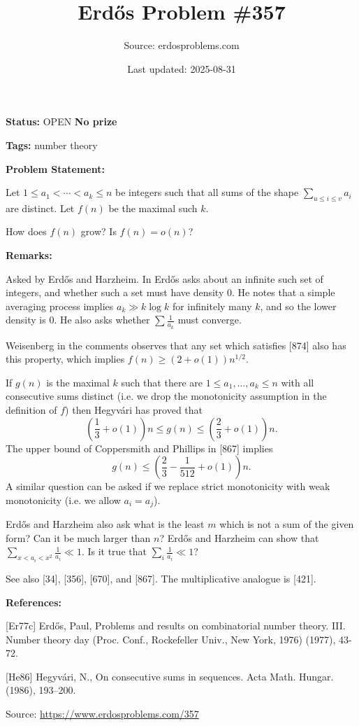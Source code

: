 \documentclass{article}
\title{Erd\H{o}s Problem \#357}
\date{Last updated: 2025-08-31}
\author{Source: erdosproblems.com}
\begin{document}
\maketitle

\noindent\textbf{Status:} OPEN \quad \textbf{No prize}

\noindent\textbf{Tags:} number theory

\medskip
\noindent\textbf{Problem Statement:}

Let $1\leq a_1<\cdots <a_k\leq n$ be integers such that all sums of the shape $\sum_{u\leq i\leq v}a_i$ are distinct. Let $f(n)$ be the maximal such $k$.

How does $f(n)$ grow? Is $f(n)=o(n)$?

\bigskip
\noindent\textbf{Remarks:}

Asked by Erd\H{o}s and Harzheim. In \cite{Er77c} Erd\H{o}s asks about an infinite such set of integers, and whether such a set must have density $0$. He notes that a simple averaging process implies $a_k \gg k\log k$ for infinitely many $k$, and so the lower density is $0$. He also asks whether $\sum\frac{1}{a_k}$ must converge.

Weisenberg in the comments observes that any set which satisfies [874] also has this property, which implies $f(n)\geq (2+o(1))n^{1/2}$.

If $g(n)$ is the maximal $k$ such that there are $1\leq a_1,\ldots,a_k\leq n$ with all consecutive sums distinct (i.e. we drop the monotonicity assumption in the definition of $f$) then Hegyv\'{a}ri \cite{He86} has proved that\[\left(\frac{1}{3}+o(1)\right) n\leq g(n)\leq \left(\frac{2}{3}+o(1)\right)n.\]The upper bound of Coppersmith and Phillips in [867] implies\[g(n) \leq \left(\frac{2}{3}-\frac{1}{512}+o(1)\right)n.\]A similar question can be asked if we replace strict monotonicity with weak monotonicity (i.e. we allow $a_i=a_j$).

Erd\H{o}s and Harzheim also ask what is the least $m$ which is not a sum of the given form? Can it be much larger than $n$? Erd\H{o}s and Harzheim can show that $\sum_{x<a_i<x^2}\frac{1}{a_i}\ll 1$. Is it true that $\sum_i \frac{1}{a_i}\ll 1$?

See also [34], [356], [670], and [867]. The multiplicative analogue is [421].

\bigskip
\noindent\textbf{References:}

[Er77c] Erd\H{o}s, Paul, Problems and results on combinatorial number theory. III. Number theory day (Proc. Conf., Rockefeller Univ.,
New York, 1976) (1977), 43-72.
 
 [He86] Hegyv\'{a}ri, N., On consecutive sums in sequences. Acta Math. Hungar. (1986), 193--200.

\bigskip
\noindent\small{Source: \url{https://www.erdosproblems.com/357}}
\end{document}
